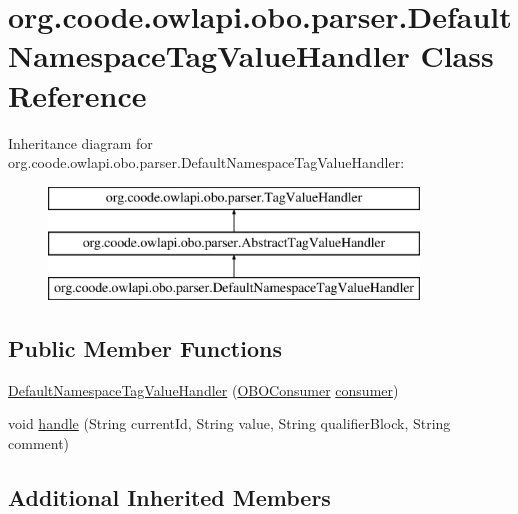 \hypertarget{classorg_1_1coode_1_1owlapi_1_1obo_1_1parser_1_1_default_namespace_tag_value_handler}{\section{org.\-coode.\-owlapi.\-obo.\-parser.\-Default\-Namespace\-Tag\-Value\-Handler Class Reference}
\label{classorg_1_1coode_1_1owlapi_1_1obo_1_1parser_1_1_default_namespace_tag_value_handler}
}
Inheritance diagram for org.\-coode.\-owlapi.\-obo.\-parser.\-Default\-Namespace\-Tag\-Value\-Handler\-:\begin{figure}[H]
\begin{center}
\leavevmode
\includegraphics[height=3.000000cm]{classorg_1_1coode_1_1owlapi_1_1obo_1_1parser_1_1_default_namespace_tag_value_handler}
\end{center}
\end{figure}
\subsection*{Public Member Functions}
\begin{DoxyCompactItemize}
\item 
\hyperlink{classorg_1_1coode_1_1owlapi_1_1obo_1_1parser_1_1_default_namespace_tag_value_handler_a411c871f7963db17aa6c5bef08959088}{Default\-Namespace\-Tag\-Value\-Handler} (\hyperlink{classorg_1_1coode_1_1owlapi_1_1obo_1_1parser_1_1_o_b_o_consumer}{O\-B\-O\-Consumer} \hyperlink{classorg_1_1coode_1_1owlapi_1_1obo_1_1parser_1_1_abstract_tag_value_handler_ab27f1ff22d15640c5f81585f18265137}{consumer})
\item 
void \hyperlink{classorg_1_1coode_1_1owlapi_1_1obo_1_1parser_1_1_default_namespace_tag_value_handler_a34d1ff79b90a8343c87b7fbf14fe0c8d}{handle} (String current\-Id, String value, String qualifier\-Block, String comment)
\end{DoxyCompactItemize}
\subsection*{Additional Inherited Members}


